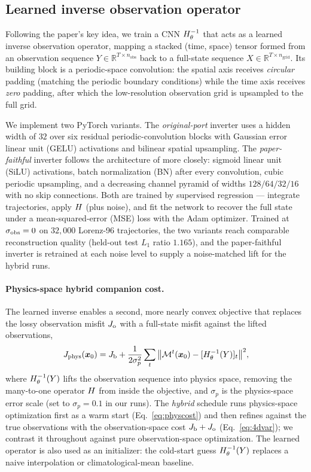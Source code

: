 \subsection{Learned inverse observation operator}

Following the paper's key idea, we train a CNN
$H^{-1}_{\theta}$ that acts as a learned inverse observation operator, mapping a stacked
(time, space) tensor formed from an observation sequence $Y\in\mathbb{R}^{T\times
n_{\text{obs}}}$ back to a full-state sequence $X\in\mathbb{R}^{T\times
n_{\text{grid}}}$. Its building block is a periodic-space convolution: the
spatial axis receives \emph{circular} padding (matching the periodic boundary
conditions) while the time axis receives \emph{zero} padding, after which the
low-resolution observation grid is upsampled to the full grid.

We implement two PyTorch variants. The
\emph{original-port} inverter uses a hidden width of $32$ over six residual
periodic-convolution blocks with Gaussian error linear unit (GELU) activations
and bilinear spatial upsampling. The \emph{paper-faithful} inverter follows the
architecture of \citet{frerix2021invobs} more closely: sigmoid linear unit
(SiLU) activations, batch normalization (BN) after
every convolution, cubic periodic upsampling, and a
decreasing channel pyramid of widths $128/64/32/16$ with no skip connections.
Both are trained by supervised regression --- integrate trajectories, apply
$H$ (plus noise), and fit the network to recover the full state under a
mean-squared-error (MSE) loss with the Adam optimizer. Trained at $\sigma_{\mathrm{obs}}=0$ on
$32{,}000$ Lorenz-96 trajectories, the two variants reach comparable
reconstruction quality (held-out test $L_1$ ratio $1.165$), and the
paper-faithful inverter is retrained at each noise level to supply a
noise-matched lift for the hybrid runs.

\paragraph{Physics-space hybrid companion cost.}
The learned inverse enables a second, more nearly convex objective that
replaces the lossy observation misfit $J_{\mathrm{o}}$ with a full-state misfit against the
lifted observations,
\begin{equation}
J_{\text{phys}}(\bm{x}_0)
= J_{\mathrm{b}} + \frac{1}{2\sigma_p^2}\sum_t \big\lVert \mathcal{M}^t(\bm{x}_0) - [H^{-1}_{\theta}(Y)]_t \big\rVert^2,
\label{eq:physcost}
\end{equation}
where $H^{-1}_{\theta}(Y)$ lifts the observation sequence into physics space, removing the
many-to-one operator $H$ from inside the objective, and $\sigma_p$ is the
physics-space error scale (set to $\sigma_p = 0.1$ in our runs). The \emph{hybrid}
schedule runs physics-space optimization first as a warm start
(Eq.~\eqref{eq:physcost}) and then refines against the true observations with the
observation-space cost $J_{\mathrm{b}}+J_{\mathrm{o}}$ (Eq.~\eqref{eq:4dvar}); we contrast it
throughout against pure observation-space optimization. The learned operator is
also used as an initializer: the cold-start guess $H^{-1}_{\theta}(Y)$ replaces a naive
interpolation or climatological-mean baseline.

